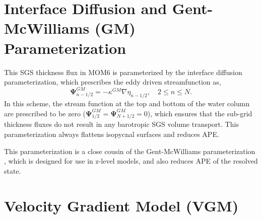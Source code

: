 \documentclass[draft]{agujournal2019}
\begin{document}
\section{Interface Diffusion and Gent-McWilliams (GM) Parameterization}
\label{app:GM_param}
This SGS thickness flux in MOM6 is parameterized by the interface diffusion parameterization, which prescribes the eddy driven streamfunction as,
\begin{equation}
    \mathbf{\Psi}^{GM}_{n-1/2} = - \kappa^{GM} \nabla \eta_{n-1/2}, \quad 2 \leq n \leq N.
    \label{eqn:GM_streamfunction}
\end{equation}
In this scheme, the stream function at the top and bottom of the water column are prescribed to be zero ($\mathbf{\Psi}^{GM}_{1/2} = \mathbf{\Psi}^{GM}_{N+1/2} = 0$), which ensures that the sub-grid thickness fluxes do not result in any barotropic SGS volume transport. This parameterization always flattens isopycnal surfaces and reduces APE.  

This parameterization is a close cousin of the Gent-McWilliams parameterization \cite{gent1990isopycnal, gent1995parameterizing}, which is designed for use in z-level models, and also reduces APE of the resolved state. 





\section{Velocity Gradient Model (VGM)}
\label{app:VGM}
\end{document}
